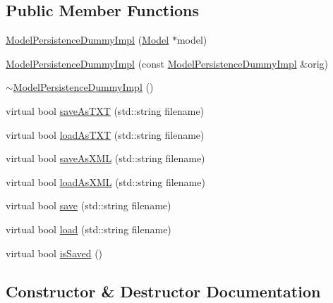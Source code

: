 \subsection*{Public Member Functions}
\begin{DoxyCompactItemize}
\item 
\hyperlink{class_model_persistence_dummy_impl_a97865afff5c5b40b1d1783e471bd8f1e}{Model\+Persistence\+Dummy\+Impl} (\hyperlink{class_model}{Model} $\ast$model)
\item 
\hyperlink{class_model_persistence_dummy_impl_ae6c0ea89a48e7886e8c8dda599c97878}{Model\+Persistence\+Dummy\+Impl} (const \hyperlink{class_model_persistence_dummy_impl}{Model\+Persistence\+Dummy\+Impl} \&orig)
\item 
\hyperlink{class_model_persistence_dummy_impl_a67f93e14bd00e6f2a645169965640e67}{$\sim$\+Model\+Persistence\+Dummy\+Impl} ()
\item 
virtual bool \hyperlink{class_model_persistence_dummy_impl_ae2a32d73317bb04150c10f1076f378df}{save\+As\+T\+XT} (std\+::string filename)
\item 
virtual bool \hyperlink{class_model_persistence_dummy_impl_a3ae3fba5794f62f3106e0749216da2fa}{load\+As\+T\+XT} (std\+::string filename)
\item 
virtual bool \hyperlink{class_model_persistence_dummy_impl_ac7c439947e013f8629681b84de8f3854}{save\+As\+X\+ML} (std\+::string filename)
\item 
virtual bool \hyperlink{class_model_persistence_dummy_impl_ac4be3036a871fd7b52781c2c12cb9b7a}{load\+As\+X\+ML} (std\+::string filename)
\item 
virtual bool \hyperlink{class_model_persistence_dummy_impl_abb93912e7f14e633a501ed83c33d6691}{save} (std\+::string filename)
\item 
virtual bool \hyperlink{class_model_persistence_dummy_impl_a220a4e73584df5d892c39b1eb8a1fa94}{load} (std\+::string filename)
\item 
virtual bool \hyperlink{class_model_persistence_dummy_impl_a68f703ffc58d6341433af51f92e9a89d}{is\+Saved} ()
\end{DoxyCompactItemize}


\subsection{Constructor \& Destructor Documentation}
